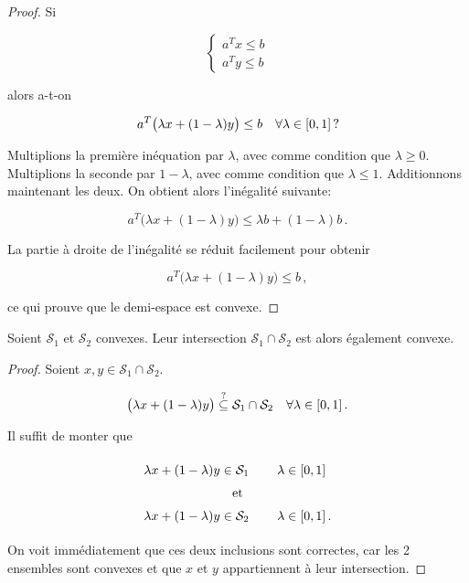 	\begin{mytheo}\label{theo:demi-espace}\leavevmode
		\begin{proof}
			Si

			\[
			\left\{
			\begin{array}{c}
				a^T x \le b\\
				a^T y \le b
			\end{array}
			\right.
			\]

			alors a-t-on

			\[
			a^T \big(\lambda x + (1 - \lambda)y\big) \le b
			\quad \forall \lambda \in \interval{0}{1}\,?
			\]

			Multiplions la première inéquation par $\lambda$,
			avec comme condition que $\lambda \ge 0$.
			Multiplions la seconde par $1-\lambda$,
			avec comme condition que $\lambda \le 1$.
			Additionnons maintenant les deux.
			On obtient alors l'inégalité suivante:

			\[
			a^T \big(\lambda x + (1 - \lambda)y\big) \le
			\lambda b + (1-\lambda) b\,.
			\]

			La partie à droite de l'inégalité se réduit facilement
			pour obtenir

			\[
			a^T \big(\lambda x + (1 - \lambda)y\big) \le b\,,
			\]

			ce qui prouve que le demi-espace est convexe.
		\end{proof}
	\end{mytheo}

	\begin{mytheo}\label{theo:inter}\leavevmode
		Soient $\mathcal{S}_1$ et $\mathcal{S}_2$ convexes.
		Leur intersection $\mathcal{S}_1 \cap \mathcal{S}_2$
		est alors également convexe.

		\begin{proof}
			Soient $x,y \in \mathcal{S}_1 \cap \mathcal{S}_2$.

			\[
			\big(\lambda x + (1 - \lambda)y\big) \overset{?}{\subseteq} \mathcal{S}_1 \cap \mathcal{S}_2
			\quad \forall \lambda \in \interval{0}{1}\,.
			\]

			Il suffit de monter que

			\[
			\renewcommand{\arraystretch}{1.5}
			\begin{tabular}{cl}
				$\lambda x + (1 - \lambda)y \in \mathcal{S}_1$ &
				$\quad \lambda \in \interval{0}{1}$\\
				\multicolumn{2}{c}{et}\\
				$\lambda x + (1 - \lambda)y \in \mathcal{S}_2$ &
				$\quad \lambda \in \interval{0}{1}\,.$\\
			\end{tabular}
			\]

			On voit immédiatement
			que ces deux inclusions sont correctes,
			car les 2 ensembles sont convexes
			et que $x$ et $y$ appartiennent à leur intersection.
		\end{proof}
	\end{mytheo}

